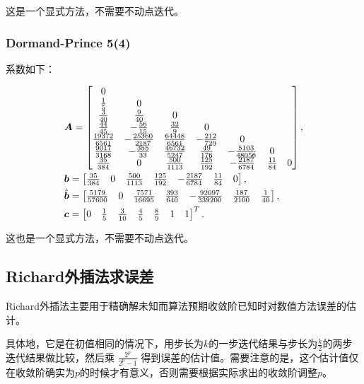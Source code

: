 \documentclass[lang=cn,a4paper,newtx,bibend=bibtex]{elegantpaper}
\begin{document}
这是一个显式方法，不需要不动点迭代。

\subsubsection{Dormand-Prince 5(4)}

系数如下：

\begin{equation*}
\begin{aligned}
    & \bm{A} = \begin{bmatrix} 
        0 & & & & & & \\
        \frac 15 & 0 & & & & & \\
        \frac 3{40} & \frac 9{40} & 0 & & & & \\
        \frac {44}{45} & -\frac{56}{15} & \frac {32}9 & 0 & & & \\
        \frac {19372}{6561} & -\frac{25360}{2187} & \frac{64448}{6561} & -\frac{212}{729} & 0 & & \\
        \frac{9017}{3168} & -\frac{355}{33} & \frac{46732}{5247} & \frac{49}{176} & -\frac{5103}{48056} & 0 & \\
        \frac{35}{384} & 0 & \frac{500}{1113} & \frac{125}{192} & -\frac{2187}{6784} & \frac{11}{84} & 0 \\
     \end{bmatrix},\\
    & \bm{b} = \begin{bmatrix} 
        \frac{35}{384} & 0 & \frac{500}{1113} & \frac{125}{192} & -\frac{2187}{6784} & \frac{11}{84} & 0 \\
     \end{bmatrix},\\
    & \hat{\bm{b}} = \begin{bmatrix} 
        \frac{5179}{57600} & 0 & \frac{7571}{16695} & \frac{393}{640} & -\frac{92097}{339200} & \frac{187}{2100} & \frac 1{40} \\
     \end{bmatrix},\\
    & \bm{c} = \begin{bmatrix} 
        0 & \frac 15 & \frac 3{10} & \frac 45 & \frac 89 & 1 & 1 \\
     \end{bmatrix}^T.
\end{aligned}
\end{equation*}

这也是一个显式方法，不需要不动点迭代。

\subsection{Richard外插法求误差}

Richard外插法主要用于精确解未知而算法预期收敛阶已知时对数值方法误差的估计。

具体地，它是在初值相同的情况下，用步长为$k$的一步迭代结果与步长为$\frac k2$的两步迭代结果做比较，然后乘 $\frac{2^p}{2^p-1}$ 得到误差的估计值。需要注意的是，这个估计值仅在收敛阶确实为$p$的时候才有意义，否则需要根据实际求出的收敛阶调整$p$。
\end{document}
